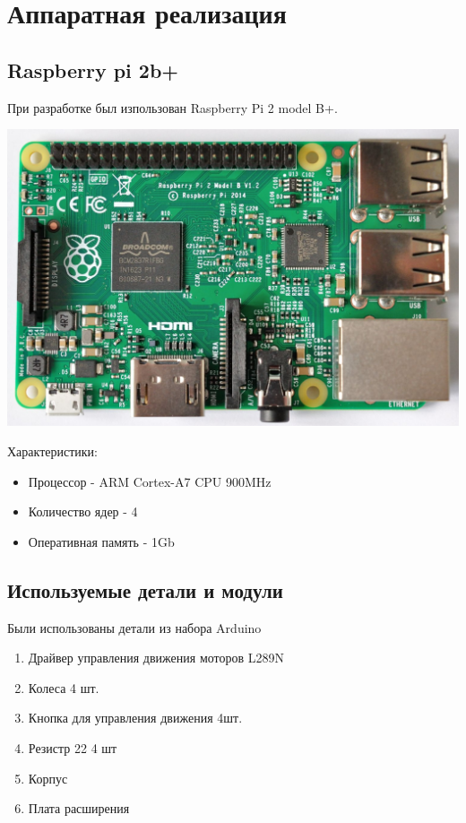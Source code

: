 \documentclass[a4paper,12pt]{article}
\begin{document}


\tableofcontents
\newpage

\section{Аппаратная реализация}
\subsection{Raspberry pi 2b+}
При разработке был изпользован Raspberry Pi 2 model B+.
\begin{center}
  \includegraphics[width=\textwidth]{raspberry_pi2_b.pdf}
\end{center}
Характеристики:
\begin{itemize}
  \item Процессор - ARM Cortex-A7 CPU 900MHz
  \item Количество ядер - 4
  \item Оперативная память - 1Gb
\end{itemize}


\subsection{Используемые детали и модули}
Были использованы детали из набора Arduino
\begin{enumerate}
  \item Драйвер управления движения моторов L289N
  \item Колеса 4 шт.
  \item Кнопка для управления движения 4шт.
  \item Резистр 22\unit{\Omega} 4 шт
  \item Корпус
  \item Плата расширения
\end{enumerate}
\end{document}
